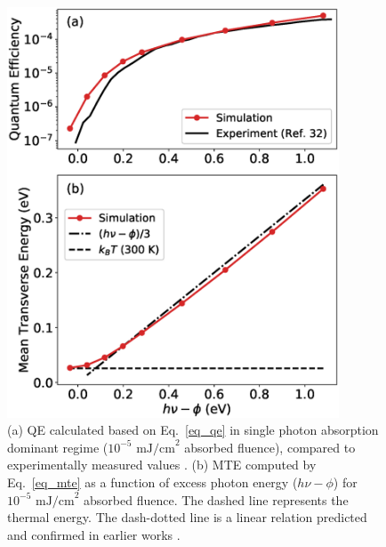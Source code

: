 \begin{figure}[h!]
	\centering
	\includegraphics*[width=280pt]{figs/boltzmann/low.eps}
	\caption{(a) QE calculated based on Eq.~\ref{eq_qe} in single photon absorption dominant regime ($10^{-5} \textrm{ mJ/cm}^2$ absorbed fluence), compared to experimentally measured values \cite{Dowell2006}. (b)  MTE computed by Eq.~\ref{eq_mte} as a function of excess photon energy ($h\nu - \phi$) for $10^{-5} \textrm{ mJ/cm}^2$ absorbed fluence. The dashed line represents the thermal energy. The dash-dotted line is a linear relation predicted and confirmed in earlier works \cite{dowell2009_QuantumEfficiencyThermal,Feng2015,Dimitrov2017}.}
	\label{fig_low}
\end{figure}

